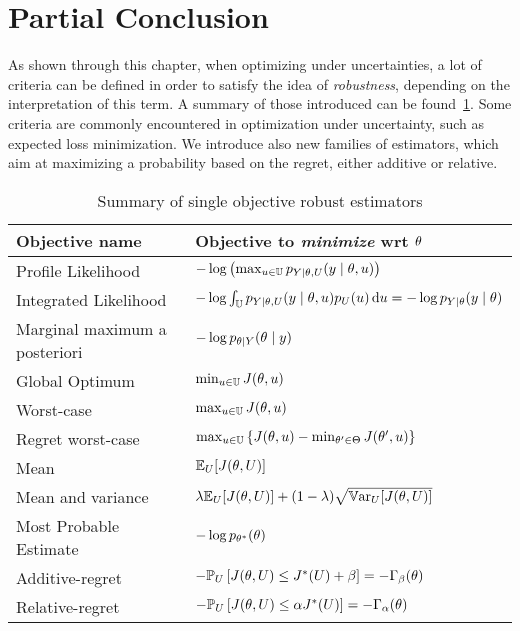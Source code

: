 \documentclass[../../Main_ManuscritThese.tex]{subfiles}
\begin{document}
\section{Partial Conclusion}
\label{sec:ch3_partial_ccl}
As shown through this chapter, when optimizing under uncertainties, a lot of criteria can be defined in order to satisfy the idea of \emph{robustness}, depending on the interpretation of this term. A summary of those introduced can be found~\cref{tab:summary_robust}. Some criteria are commonly encountered in optimization under uncertainty, such as expected loss minimization. We introduce also new families of estimators, which aim at maximizing a probability based on the regret, either additive or relative.
\begin{table}[ht]
  \centering
  \begin{tabular}{ll}
    \toprule
    Objective name & Objective to \emph{minimize} wrt $\theta$  \\ \midrule
    Profile Likelihood & $-\log \left(\max_{u \in \mathbb{U}} p_{Y \mid \theta, U}(y \mid \theta, u)\right)$  \\
    Integrated Likelihood & $-\log \int_{\mathbb{U}} p_{Y \mid \theta, U}(y \mid \theta, u)p_{U}(u) \,\mathrm{d}u=-\log p_{Y\mid \theta}(y\mid \theta)$ \\
    Marginal maximum a posteriori & $-\log p_{\theta\mid Y}(\theta \mid y)$  \\ \midrule
    Global Optimum & $\min_{u\in\mathbb{U}} J(\theta, u)$ \\
    Worst-case & $\max_{u \in \mathbb{U}} J(\theta, u)$ \\
    Regret worst-case & $\max_{u\in\mathbb{U}}\left\{J(\theta, u) - \min_{\theta^{\prime}\in\Theta} J(\theta^{\prime}, u)\right\}$ \\ \midrule
    Mean & $\mathbb{E}_{U}[J(\theta, U)]$  \\
    Mean and variance & $ \lambda \mathbb{E}_{U}[J(\theta, U)] + (1-\lambda) \sqrt{\mathbb{V}\mathrm{ar}_{U}[J(\theta, U)]}$  \\ \midrule
    Most Probable Estimate & $-\log p_{\theta^*}(\theta)$ \\
    Additive-regret & $-\mathbb{P}_{U}\left[J(\theta, U) \leq J^*(U) + \beta \right]=-\Gamma_{\beta}(\theta)$ \\
    Relative-regret & $-\mathbb{P}_{U}\left[J(\theta, U) \leq \alpha J^*(U) \right]=-\Gamma_{\alpha}(\theta) $ \\ \bottomrule
  \end{tabular}
  \caption{\label{tab:summary_robust} Summary of single objective robust estimators}
\end{table}
 
\end{document}
